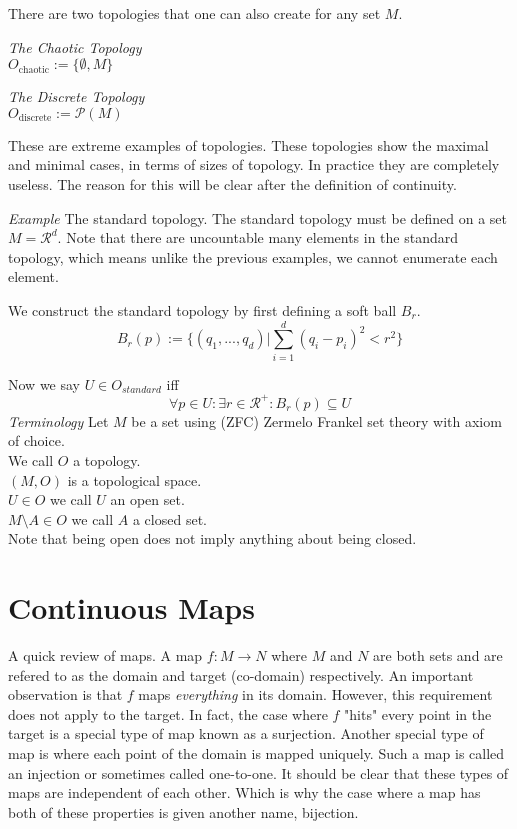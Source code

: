 \documentclass{article}
\begin{document}
	\noindent There are two topologies that one can also create for any set $M$.

	\noindent\textit{The Chaotic Topology} \\
	$ O_{\textrm{chaotic}} := \{\emptyset, M\}$
	
	\noindent\textit{The Discrete Topology}\\
	$ O_{\textrm{discrete}} := \mathscr{P}(M) $

	\noindent These are extreme examples of topologies. These topologies show the maximal
	and minimal cases, in terms of sizes of topology. In practice they are completely
	useless. The reason for this will be clear after the definition of continuity.

	\noindent\textit{Example} The standard topology. 
	The standard topology must be defined on a set $M =\mathscr{R}^d$. Note that there 
	are uncountable many elements in the standard topology, which means unlike
	the previous examples, we cannot enumerate each element.

	\noindent We construct the standard topology by first defining a soft ball $B_r$.
	$$ B_r(p) := \{(q_1,...,q_d) | \sum_{i=1}^{d} (q_i-p_i)^2 < r^2\} $$

	\noindent Now we say $U\in O_{standard}$ iff
	$$ \forall p\in U: \exists r\in \mathscr{R}^+ : B_r(p) \subseteq U $$
	\vspace{0.25cm}
	\noindent\textit{Terminology}
	Let $M$ be a set using (ZFC) Zermelo Frankel set theory with axiom of choice.\\
	We call $O$ a topology.\\
	$(M, O)$ is a topological space.\\
	$U\in O$ we call $U$ an open set.\\
	$M\textrm{\textbackslash} A\in O$ we call $A$ a closed set.\\
	Note that being open does not imply anything about being closed.

	\section{Continuous Maps}
	\noindent A quick review of maps. A map $f:M\longrightarrow N$ where $M$ and $N$ are both 
	sets and are refered to as the domain and target (co-domain) respectively. An 
	important observation is that $f$ maps \textit{everything} in its domain. However,
	this requirement does not apply to the target. In fact, the case where $f$ "hits"
	every point in the target is a special type of map known as a surjection. Another
	special type of map is where each point of the domain is mapped uniquely. Such
	a map is called an injection or sometimes called one-to-one. It should be clear
	that these types of maps are independent of each other. Which is why the case
	where a map has both of these properties is given another name, bijection.
\end{document}

